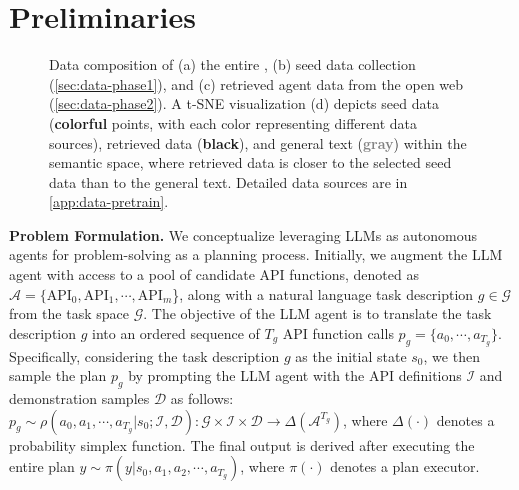 \section{Preliminaries}
\label{sec:preliminary}

\begin{figure*} [t]
	\centering
   \vspace{-2ex}
	\caption{Data composition of (a) the entire \dataset, (b) seed data collection (\cref{sec:data-phase1}), and (c) retrieved agent data from the open web (\cref{sec:data-phase2}). A t-SNE visualization (d) depicts seed data (\textbf{colorful} points, with each color representing different data sources), retrieved data (\textbf{black}), and general text (\textcolor{gray}{\textbf{gray}}) within the semantic space, where retrieved data is closer to the selected seed data than to the general text. Detailed data sources are in \cref{app:data-pretrain}.
 }
\vspace{-2ex}
\label{fig:data}
\end{figure*}


\noindent \textbf{Problem Formulation.} We conceptualize leveraging LLMs as autonomous agents for problem-solving as a planning process.
Initially, we augment the LLM agent with access to a pool of candidate API functions, denoted as $\mathcal{A}=\{\text{API}_0,\text{API}_1,\cdots,\text{API}_m$\}, along with a natural language task description $g\in\mathcal{G}$ from the task space $\mathcal{G}$. 
The objective of the LLM agent is to translate the task description $g$ into an ordered sequence of $T_g$ API function calls $p_g=\{a_0,\cdots,a_{T_g}\}$.
Specifically, considering the task description $g$ as the initial state $s_0$, we then sample the plan $p_g$ by prompting the LLM agent with the API definitions $\mathcal{I}$ and demonstration samples $\mathcal{D}$ as follows: $p_g\sim\rho(a_0,a_1,\cdots,a_{T_g}|s_0;\mathcal{I},\mathcal{D}):\mathcal{G}\times\mathcal{I}\times\mathcal{D}\to\Delta(\mathcal{A}^{T_g})$, where $\Delta(\cdot)$ denotes a probability simplex function. 
The final output is derived after executing the entire plan $y\sim\pi(y|s_0,a_1,a_2,\cdots,a_{T_g})$, where $\pi(\cdot)$ denotes a plan executor.

